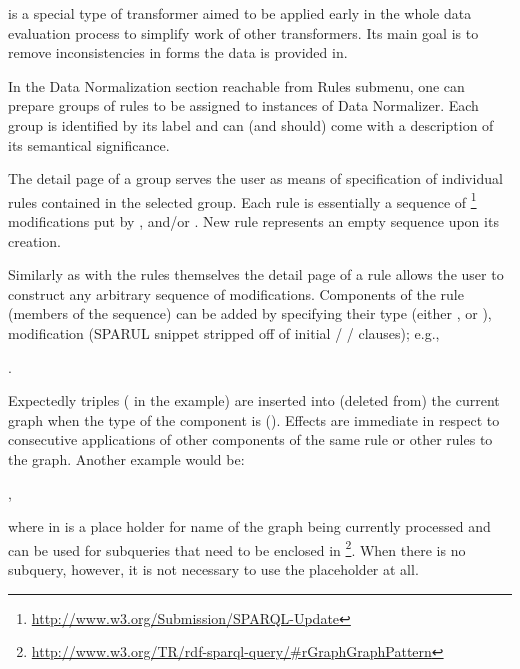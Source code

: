  is a special type of {transformer} aimed to be applied early in the whole data evaluation process to simplify work of other {transformers}. Its main goal is to remove inconsistencies in forms the data is provided in.

In the Data Normalization section reachable from Rules submenu, one can prepare groups of rules to be assigned to instances of {Data Normalizer}. Each group is identified by its label and can (and should) come with a description of its semantical significance.

The detail page of a group serves the user as means of specification of individual rules contained in the selected group. Each rule is essentially a sequence of \footnote{\url{http://www.w3.org/Submission/SPARQL-Update}} modifications put by ,  and/or . New rule represents an empty sequence upon its creation.

Similarly as with the rules themselves the detail page of a rule allows the user to construct any arbitrary sequence of modifications. Components of the rule (members of the sequence) can be added by specifying their type (either ,  or ), modification ({SPARUL} snippet stripped off of initial  /  /  clauses); e.g.,

\begin{center}
	.
\end{center}

Expectedly triples ( in the example) are inserted into (deleted from) the current graph when the type of the component is  (). Effects are immediate in respect to consecutive applications of other components of the same rule or other rules to the graph. Another example would be:

\begin{center}
	,
\end{center}

where  in  is a place holder for name of the graph being currently processed and can be used for subqueries that need to be enclosed in \footnote{\url{http://www.w3.org/TR/rdf-sparql-query/\#rGraphGraphPattern}}. When there is no subquery, however, it is not necessary to use the placeholder at all.

